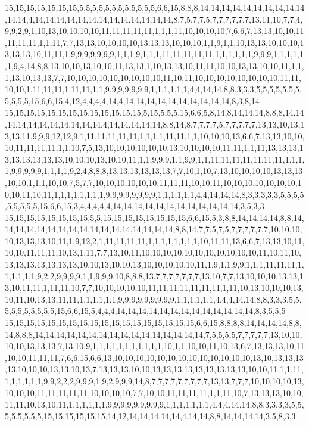 15,15,15,15,15,15,15,5,5,5,5,5,5,5,5,5,5,5,5,6,6,15,8,8,8,14,14,14,14,14,14,14,14,14,14,14,14,4,14,14,14,14,14,14,14,14,14,14,14,14,14,8,7,5,7,7,5,7,7,7,7,7,7,13,11,10,7,7,4,9,9,2,9,1,10,13,10,10,10,10,11,11,11,11,11,1,1,1,11,10,10,10,10,7,6,6,7,13,13,10,10,11,11,11,11,1,1,11,7,7,13,13,10,10,10,10,13,13,13,10,10,10,1,1,9,1,1,10,13,13,10,10,10,13,13,13,10,11,11,1,9,9,9,9,9,9,9,1,1,1,9,1,1,1,11,11,11,11,11,1,1,1,1,1,1,9,9,9,1,1,1,1,1,1,9,4,14,8,8,13,10,10,13,10,10,11,13,13,1,10,13,13,10,11,11,10,10,13,13,10,10,11,1,1,1,13,10,13,13,7,7,10,10,10,10,10,10,10,10,10,11,10,11,10,10,10,10,10,10,10,10,11,11,10,10,1,11,11,11,1,11,11,1,1,9,9,9,9,9,9,9,1,1,1,1,1,1,4,4,14,14,8,8,3,3,3,5,5,5,5,5,5,5,5,5,5,5,15,6,6,15,4,12,4,4,4,4,14,4,14,14,14,14,14,14,14,14,14,14,8,3,8,14
15,15,15,15,15,15,15,15,15,15,15,15,15,5,15,5,5,5,15,6,6,5,8,14,8,14,14,14,8,8,8,14,14,14,14,14,14,14,14,14,14,14,4,14,14,14,14,14,8,8,14,8,7,7,7,7,5,7,7,7,7,7,13,13,10,13,13,13,11,9,9,9,12,12,9,1,11,11,11,11,11,1,1,1,1,11,11,1,1,10,10,10,13,6,6,7,13,13,10,10,10,11,11,11,11,1,1,10,7,5,13,10,10,10,10,10,10,13,10,10,10,10,11,11,1,1,11,13,13,13,13,13,13,13,13,13,10,10,10,13,10,10,11,1,1,9,9,9,1,1,9,9,1,1,11,11,11,11,11,11,11,1,1,1,1,9,9,9,9,9,1,1,1,1,9,2,4,8,8,8,13,13,13,13,13,13,7,7,10,1,10,7,13,10,10,10,10,13,13,13,10,10,1,1,1,10,10,7,5,7,7,10,10,10,10,10,10,11,11,11,10,10,11,10,10,10,10,10,10,10,10,10,11,10,11,1,1,1,1,1,1,1,1,9,9,9,9,9,9,9,9,1,1,1,1,1,1,4,4,14,14,14,8,3,3,3,3,3,5,5,5,5,5,5,5,5,5,15,6,6,15,3,4,4,4,4,4,14,14,14,14,14,14,14,14,14,14,14,14,3,5,3,3
15,15,15,15,15,15,15,15,5,5,15,15,15,15,15,15,15,15,6,6,15,5,3,8,8,14,14,14,14,8,8,14,14,14,14,14,14,14,14,14,14,14,14,14,14,14,14,14,8,8,14,7,7,5,7,5,7,7,7,7,7,7,10,10,10,10,13,13,13,10,11,1,9,12,2,1,11,11,11,11,1,1,1,1,1,1,1,1,10,11,11,13,6,6,7,13,13,10,11,10,10,11,11,11,10,13,1,11,7,7,13,10,11,10,10,10,10,10,10,10,10,10,10,10,11,10,11,10,13,13,13,13,13,13,13,10,10,13,10,10,13,10,10,10,10,10,11,1,9,1,1,9,9,1,1,1,11,11,11,1,1,1,1,1,1,9,2,2,9,9,9,9,1,1,9,9,9,10,8,8,8,13,7,7,7,7,7,7,7,13,10,7,7,13,10,10,10,13,13,13,10,11,11,1,11,11,10,7,7,10,10,10,10,10,11,11,11,11,11,11,11,1,11,10,13,10,10,10,13,10,11,10,13,13,11,11,1,1,1,1,1,1,9,9,9,9,9,9,9,9,9,1,1,1,1,1,1,4,4,4,14,14,8,8,3,3,3,5,5,5,5,5,5,5,5,5,5,15,6,6,15,5,4,4,4,14,14,14,14,14,14,14,14,14,14,14,14,14,8,3,5,5,5
15,15,15,15,15,15,15,15,15,15,15,15,15,15,15,15,15,15,6,6,15,8,8,8,8,14,14,14,14,8,8,14,8,8,8,14,14,14,14,14,14,14,14,14,14,14,14,14,14,14,14,7,5,5,5,5,7,7,7,7,7,13,10,10,10,10,13,13,13,7,13,10,9,1,1,1,1,1,1,1,1,1,1,1,10,1,1,10,10,11,10,13,6,7,13,13,13,10,11,10,10,11,11,11,7,6,6,15,6,6,13,10,10,10,10,10,10,10,10,10,10,10,10,10,13,10,13,13,13,13,10,10,10,13,13,10,13,7,13,13,13,10,10,13,13,13,13,13,13,13,13,13,10,10,11,1,1,11,1,1,1,1,1,1,9,9,2,2,2,9,9,9,1,9,2,9,9,9,14,8,7,7,7,7,7,7,7,7,7,13,13,7,7,7,10,10,10,10,13,10,10,10,11,11,11,11,11,10,10,10,10,7,7,10,10,11,11,11,11,1,1,11,10,7,13,13,13,10,10,11,11,10,13,10,11,1,1,1,1,1,1,9,9,9,9,9,9,9,9,9,1,1,1,1,1,1,1,4,4,4,14,14,8,8,3,3,3,3,5,5,5,5,5,5,5,5,15,15,15,15,15,15,14,12,14,14,14,14,14,4,14,14,8,8,14,14,14,14,3,5,8,3,3
